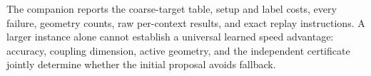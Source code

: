 

The companion reports the coarse-target table, setup and label costs, every failure, geometry counts, raw per-context results, and exact replay instructions. A larger instance alone cannot establish a universal learned speed advantage: accuracy, coupling dimension, active geometry, and the independent certificate jointly determine whether the initial proposal avoids fallback.
